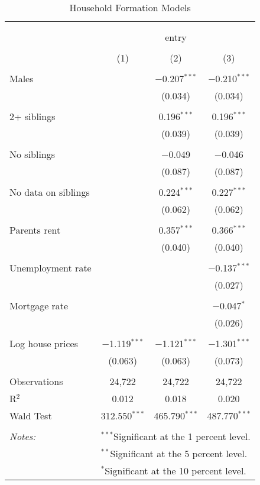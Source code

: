 
\begin{table}[!htbp] \centering 
  \caption{Household Formation Models} 
  \label{mainRes} 
\begin{tabular}{@{\extracolsep{1pt}}lccc} 
\\[-1.8ex]\hline 
\hline \\[-1.8ex] 
\\[-1.8ex] & \multicolumn{3}{c}{entry} \\ 
\\[-1.8ex] & (1) & (2) & (3)\\ 
\hline \\[-1.8ex] 
 Males &  & $-$0.207$^{***}$ & $-$0.210$^{***}$ \\ 
  &  & (0.034) & (0.034) \\ 
  & & & \\ 
 2+ siblings &  & 0.196$^{***}$ & 0.196$^{***}$ \\ 
  &  & (0.039) & (0.039) \\ 
  & & & \\ 
 No siblings &  & $-$0.049 & $-$0.046 \\ 
  &  & (0.087) & (0.087) \\ 
  & & & \\ 
 No data on siblings &  & 0.224$^{***}$ & 0.227$^{***}$ \\ 
  &  & (0.062) & (0.062) \\ 
  & & & \\ 
 Parents rent &  & 0.357$^{***}$ & 0.366$^{***}$ \\ 
  &  & (0.040) & (0.040) \\ 
  & & & \\ 
 Unemployment rate &  &  & $-$0.137$^{***}$ \\ 
  &  &  & (0.027) \\ 
  & & & \\ 
 Mortgage rate &  &  & $-$0.047$^{*}$ \\ 
  &  &  & (0.026) \\ 
  & & & \\ 
 Log house prices & $-$1.119$^{***}$ & $-$1.121$^{***}$ & $-$1.301$^{***}$ \\ 
  & (0.063) & (0.063) & (0.073) \\ 
  & & & \\ 
Observations & 24,722 & 24,722 & 24,722 \\ 
R$^{2}$ & 0.012 & 0.018 & 0.020 \\ 
Wald Test & 312.550$^{***}$ & 465.790$^{***}$ & 487.770$^{***}$ \\ 
\hline \\[-1.8ex] 
\textit{Notes:} & \multicolumn{3}{l}{$^{***}$Significant at the 1 percent level.} \\ 
 & \multicolumn{3}{l}{$^{**}$Significant at the 5 percent level.} \\ 
 & \multicolumn{3}{l}{$^{*}$Significant at the 10 percent level.} \\ 
\end{tabular} 
\end{table} 
